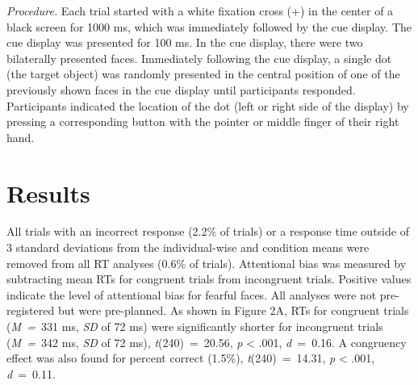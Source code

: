 \documentclass[issue,header,twocolumn,empirical, authordate,10pt]{jote-new-article}
\begin{document}
\emph{Procedure. }Each trial started with a white fixation cross (+) in the center of a black screen for 1000 ms, which was immediately followed by the cue display. The cue display was presented for 100 ms. In the cue display, there were two bilaterally presented faces. Immediately following the cue display, a single dot (the target object) was randomly presented in the central position of one of the previously shown faces in the cue display until participants responded. Participants indicated the location of the dot (left or right side of the display) by pressing a corresponding button with the pointer or middle finger of their right hand.

\section{Results}

All trials with an incorrect response (2.2\% of trials) or a response time outside of 3 standard deviations from the individual-wise and condition means were removed from all RT analyses (0.6\% of trials). Attentional bias was measured by subtracting mean RTs for congruent trials from incongruent trials. Positive values indicate the level of attentional bias for fearful faces. All analyses were not pre-registered but were pre-planned. As shown in Figure 2A, RTs for congruent trials (\emph{M~=~}331 ms, \emph{SD} of 72 ms) were significantly shorter for incongruent trials (\emph{M~=~}342 ms, \emph{SD} of 72 ms), \emph{t}(240)~=~20.56, \emph{p} < .001, \emph{d}~=~0.16. A congruency effect was also found for percent correct (1.5\%), \emph{t}(240)~=~14.31, \emph{p} < .001, \emph{d}~=~0.11.
\end{document}
